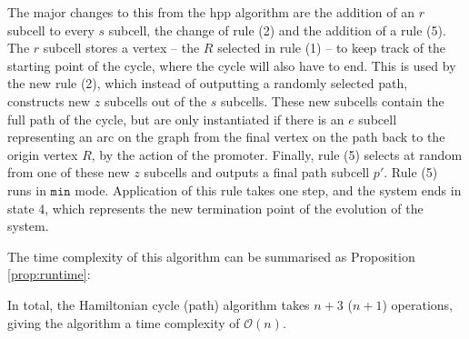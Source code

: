 The major changes to this from the \gls{hpp} algorithm are the addition of an \(r\) subcell to every \(s\) subcell, the change of rule (2) and the addition of a rule (5). The \(r\) subcell stores a vertex -- the \(R\) selected in rule (1) -- to keep track of the starting point of the cycle, where the cycle will also have to end.  This is used by the new rule (2), which instead of outputting a randomly selected path, constructs new \(z\) subcells out of the \(s\) subcells.  These new subcells contain the full path of the cycle, but are only instantiated if there is an \(e\) subcell representing an arc on the graph from the final vertex on the path back to the origin vertex \(R\), by the action of the promoter.  Finally, rule (5) selects at random from one of these new \(z\) subcells and outputs a final path subcell \(p'\).  Rule (5) runs in \(\mathtt{min}\) mode.  Application of this rule takes one step, and the system ends in state 4, which represents the new termination point of the evolution of the system.

The time complexity of this algorithm can be summarised as Proposition \ref{prop:runtime}:

\begin{proposition}
In total, the Hamiltonian cycle (path) algorithm takes \(n + 3\) (\(n + 1\)) operations, giving the algorithm a time complexity of \(\mathcal{O}(n)\).
\label{prop:runtime}
\end{proposition}